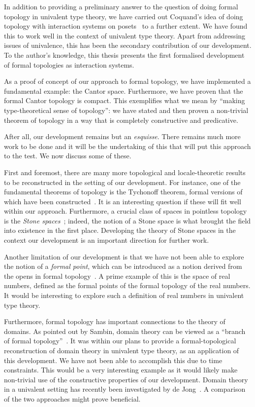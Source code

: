 In addition to providing a preliminary answer to the question of doing formal topology in
univalent type theory, we have carried out Coquand's idea of doing topology with
interaction systems on posets~\cite{coq-posets} to a further extent. We have found this to
work well in the context of univalent type theory. Apart from addressing issues of
univalence, this has been the secondary contribution of our development. To the author's
knowledge, this thesis presents the first formalised development of formal topologies as
interaction systems.

As a proof of concept of our approach to formal topology, we have implemented a
fundamental example: the Cantor space. Furthermore, we have proven that the formal Cantor
topology is compact. This exemplifies what we mean by ``making type-theoretical sense of
topology'': we have stated and then proven a non-trivial theorem of topology in a way that
is completely constructive and predicative.

After all, our development remains but an \emph{esquisse}. There remains much more work to
be done and it will be the undertaking of this that will put this approach to the test. We
now discuss some of these.

First and foremost, there are many more topological and locale-theoretic results to be
reconstructed in the setting of our development. For instance, one of the fundamental
theorems of topology is the Tychonoff theorem, formal versions of which have been
constructed~\cite{coq-tychonoff, vickers-tychonoff}. It is an interesting question if
these will fit well within our approach. Furthermore, a crucial class of spaces in
pointless topology is the \emph{Stone spaces}~\cite{stone-spaces}; indeed, the notion of a
Stone space is what brought the field into existence in the first place. Developing the
theory of Stone spaces in the context our development is an important direction for
further work.

Another limitation of our development is that we have not been able to explore the notion
of a \emph{formal point}, which can be introduced as a notion derived from the opens in
formal topology~\cite[pg.~94]{coq-sambin}. A prime example of this is the space of real
numbers, defined as the formal points of the formal topology of the real numbers. It would
be interesting to explore such a definition of real numbers in univalent type theory.

Furthermore, formal topology has important connections to the theory of domains. As
pointed out by Sambin, domain theory can be viewed as a ``branch of formal
topology''~\cite{sambin-domains}. It was within our plans to provide a formal-topological
reconstruction of domain theory in univalent type theory, as an application of this
development. We have not been able to accomplish this due to time constraints. This would
be a very interesting example as it would likely make non-trivial use of the constructive
properties of our development. Domain theory in a univalent setting has recently been
investigated by de Jong~\cite{de-jong-domains}. A comparison of the two approaches might
prove beneficial.

